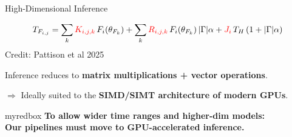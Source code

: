 \documentclass{beamer}
\begin{document}
\begin{frame}{High-Dimensional Inference}

\[
T_{F_{i,j}}
=
\sum_k {\color{red}K_{i,j,k}}\, F_i(\theta_{F_k})
+
\sum_k {\color{red}R_{i,j,k}}\, F_i(\theta_{F_k})\,|\Gamma| \alpha
+
{\color{red}J_i}\, T_H\, (1 + |\Gamma| \alpha)
\]
\vspace{-0.2em}
\hfill \tiny{Credit: Pattison et al 2025}


\footnotesize
Inference reduces to {\color{red}\textbf{matrix multiplications + vector operations}}.

\hspace{1.5em}$\Rightarrow$ Ideally suited to the {\color{red}\textbf{SIMD/SIMT architecture of modern GPUs}}.

\pause
\vspace{-10em}
\begin{center}
\begin{beamercolorbox}[
    wd=\textwidth,
    rounded=true,
    shadow=true,
    sep=1em
]{myredbox}
\centering
\large
\textbf{To allow wider time ranges and higher-dim models: \\[5pt]
Our pipelines must move to GPU-accelerated inference.}
\end{beamercolorbox}
\end{center}
\end{frame}
\end{document}
